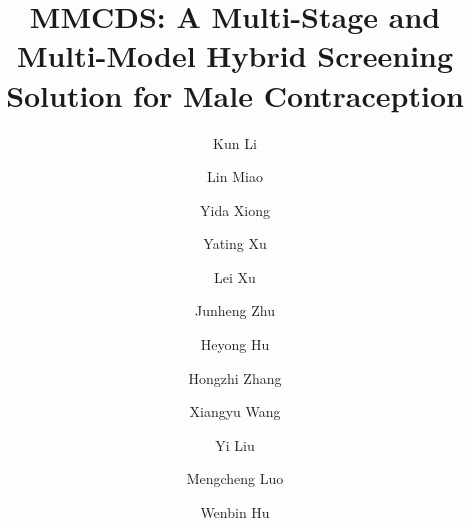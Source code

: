 \documentclass[preprint,12pt]{elsarticle}
\theoremstyle{plain}
\theoremstyle{definition}
\theoremstyle{remark}
\begin{document}
\begin{frontmatter}

\title{MMCDS: A Multi-Stage and Multi-Model Hybrid Screening Solution for Male Contraception}

\author[whu-cs]{Kun Li}
\author[whu-med]{Lin Miao}
\author[whu-cs]{Yida Xiong}
\author[sustech]{Yating Xu}
\author[whu-med]{Lei Xu}
\author[whu-med]{Junheng Zhu}
\author[whu-med]{Heyong Hu}
\author[whu-cs]{Hongzhi Zhang}
\author[hbmch]{Xiangyu Wang}
\author[hust]{Yi Liu}
\author[whu-med]{Mengcheng Luo}
\author[whu-cs]{Wenbin Hu}

\address[whu-cs]{School of Computer Science, Wuhan University, Wuhan 430037, Hubei, China}
\address[whu-med]{State Key Laboratory of Metabolism and Regulation in Complex Organisms, Hubei Provincial Key Laboratory of Developmentally Originated Disease, TaiKang Center for Life and Medical Sciences, Taikang Medical School (School of Basic Medical Sciences), Wuhan University, Wuhan 430071, China}
\address[hust]{Department of Obstetrics and Gynecology, Wuhan Union Hospital, Tongji Medical College, Huazhong University of Science and Technology, Wuhan 430022, Hubei, China}
\address[sustech]{National Clinical Research Center for Infectious Diseases, Guangdong Provincial Clinical Research Center for Tuberculosis, Shenzhen Third People's Hospital, Southern University of Science and Technology, Shenzhen 518112, Guangdong, China}
\address[hbmch]{Maternal and Child Health Hospital of Hubei Province, Tongji Medical College, Huazhong University of Science and Technology, Wuhan 430070, Hubei, China}



\end{frontmatter}
\end{document}
